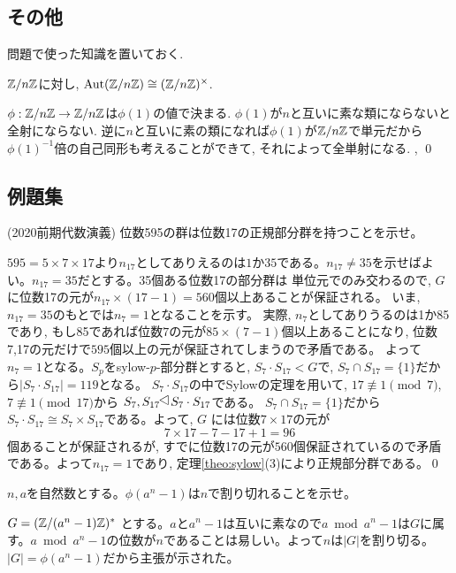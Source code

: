 \subsection{その他}
問題で使った知識を置いておく.
\begin{prop}
$\mathbb{Z}/n\mathbb{Z}$に対し, $\mathrm{Aut}(\mathbb{Z}/n\mathbb{Z}) \cong (\mathbb{Z}/n\mathbb{Z})^{\times}$.
\end{prop}
\prf $\phi:\mathbb{Z}/n\mathbb{Z} \to \mathbb{Z}/n\mathbb{Z}$は$\phi(1)$の値で決まる. $\phi(1)$が$n$と互いに素な類にならないと全射にならない. 逆に$n$と互いに素の類になれば$\phi(1)$が$\mathbb{Z}/n\mathbb{Z}$で単元だから$\phi(1)^{-1}$倍の自己同形も考えることができて, それによって全単射になる. ,
\qed



\subsection{例題集}
\begin{egprob} (2020前期代数演義)
位数595の群は位数17の正規部分群を持つことを示せ。
\end{egprob}
\begin{egans}
$595=5\times 7\times 17$より$n_{17}$としてありえるのは$1$か$35$である。$n_{17} \neq 35$を示せばよい。$n_{17} = 35$だとする。35個ある位数17の部分群は 単位元でのみ交わるので, $G$に位数17の元が$n_{17}\times (17-1) = 560$個以上あることが保証される。
いま, $n_{17} = 35$のもとでは$n_{7} = 1$となることを示す。
実際, $n_{7}$としてありうるのは1か85であり, もし85であれば位数$7$の元が$85\times (7-1)$個以上あることになり, 位数7,17の元だけで$595$個以上の元が保証されてしまうので矛盾である。
よって$n_{7} = 1$となる。$S_{p}$をsylow-$p$-部分群とすると, $S_7 \cdot S_{17} < G$で, $S_7\cap S_{17}= \{ 1 \}$だから$|S_{7}\cdot S_{17}| = 119$となる。
$S_{7}\cdot S_{17}$の中でSylowの定理を用いて, $17\not\equiv 1 \pmod{7}$, $7\not\equiv 1\pmod{17}$から
$S_{7}, S_{17} \rotatebox{90}{$\triangle$} S_{7}\cdot S_{17}$である。
$S_{7}\cap S_{17} = \{ 1 \}$だから$S_{7}\cdot S_{17} \cong S_{7}\times S_{17}$である。よって, $G$ には位数$7\times 17$の元が
\[7\times 17 - 7 - 17 + 1 = 96\]
個あることが保証されるが, すでに位数17の元が$560$個保証されているので矛盾である。よって$n_{17} = 1$であり, 定理\ref{theo:sylow}(3)により正規部分群である。\qed
\end{egans}

\begin{egprob}
$n,a$を自然数とする。$\phi(a^{n} - 1)$は$n$で割り切れることを示せ。
\end{egprob}
\begin{egans}
$G = (\mathbb{Z}/(a^{n} - 1)\mathbb{Z})^{\ast}$ とする。$a$と$a^{n} - 1$は互いに素なので$a\bmod{a^{n} - 1}$は$G$に属す。$a \bmod{a^{n}-1}$の位数が$n$であることは易しい。よって$n$は$|G|$を割り切る。$|G| = \phi(a^{n} - 1)$だから主張が示された。
\end{egans}


